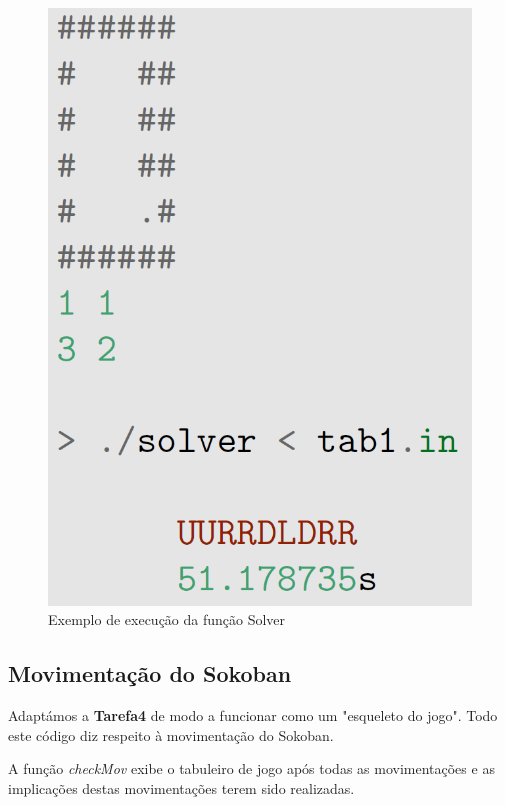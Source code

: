 \documentclass[12pt,a4paper]{report}
\begin{document}
\begin{figure}[h]
    \includegraphics[scale=0.3]{images/Capturar3.PNG}
    \centering
    \caption{Exemplo de execução da função Solver}
\end{figure}


\newpage

\subsection{Movimentação do Sokoban}

\hfill


Adaptámos a \textbf{Tarefa4} de modo a funcionar como um "esqueleto do jogo". Todo este código diz respeito à movimentação do Sokoban.

A função \emph{checkMov} exibe o tabuleiro de jogo após todas as movimentações e as implicações destas movimentações terem sido realizadas. 
 
\end{document}
